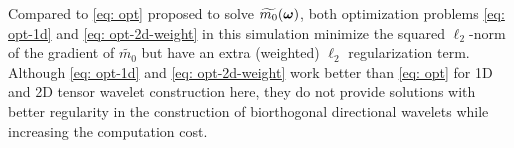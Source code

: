Compared to \eqref{eq: opt} proposed to solve $\widetilde{m_{0}}(\boldsymbol{\omega})$, both optimization problems \eqref{eq: opt-1d} and \eqref{eq: opt-2d-weight} in this simulation minimize the squared $\ell_2$-norm of the gradient of $\widetilde{m_0}$ but have an extra (weighted) $\ell_2$ regularization term. Although \eqref{eq: opt-1d} and \eqref{eq: opt-2d-weight} work better than \eqref{eq: opt} for 1D and 2D tensor wavelet construction here, they do not provide solutions with better regularity in the construction of biorthogonal directional wavelets while increasing the computation cost.

\begin{comment}
\begin{minipage}{.9\textwidth}
\centering
\texttt{[image: 2d-m-compare-2-1-eps-converted-to.pdf]}\\
\texttt{[image: 2d-filter-compare-2-1-eps-converted-to.pdf]}
\captionof{figure}{result of \eqref{eq: opt-2d-weight} $\mhat{0}$ ($\lambda = 60$), target $\m{0}$ and their difference, Top: frequency domain, Bottom: time domain}
\label{fig: 2d-compare-2}
\end{minipage}
\end{comment}

